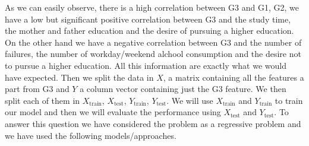 \documentclass[a4paper, 11pt]{report}
\theoremstyle{definition}
\numberwithin{equation}{section}		%
\numberwithin{figure}{section}			%
\numberwithin{table}{section}				%
\begin{document}
As we can easily observe, there is a high correlation between G3 and G1, G2, we have a low but significant positive correlation between G3 and the study time, the mother and father education and the desire of pursuing a higher education. On the other hand we have a negative correlation between G3 and the number of failures, the number of workday/weekend alchool consumption and the desire not to pursue a higher education. All this information are exactly what we would have expected. Then we split the data in $X$, a matrix containing all the features a part from G3 and $Y$ a column vector containing just the G3 feature. We then split each of them in $X_{\text{train}}$, $X_{\text{test}}$, $Y_{\text{train}}$, $Y_{\text{test}}$. We will use $X_{\text{train}}$ and $Y_{\text{train}}$ to train our model and then we will evaluate the performance using $X_{\text{test}}$ and $Y_{\text{test}}$. To answer this question we have considered the problem as a regressive problem and we have used the following models/approaches.
\end{document}
